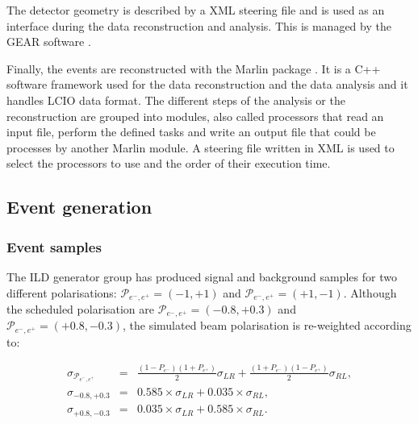     The detector geometry is described by a XML steering file and is used as an interface during the data reconstruction and analysis.
    This is managed by the \gls{GEAR} software \cite{GEAR}.

    Finally, the events are reconstructed with the \gls{Marlin} package \cite{MARLIN}.
    It is a C++ software framework used for the data reconstruction and the data analysis and it handles \gls{LCIO} data format.
    The different steps of the analysis or the reconstruction are grouped into modules, also called processors that read an input file, perform the defined tasks and write an output file that could be processes by another \gls{Marlin} module.
    A steering file written in XML is used to select the processors to use and the order of their execution time.

  \subsection{Event generation}
     
     \subsubsection{Event samples}

     The \gls{ILD} generator group has produced signal and background samples for two different polarisations:  $\mathcal{P}_{e^-,e^+} = (-1,+1)$ and $\mathcal{P}_{e^-,e^+} = (+1,-1)$.
     Although the scheduled polarisation are $\mathcal{P}_{e^-,e^+} = (-0.8,+0.3)$ and  $\mathcal{P}_{e^-,e^+} = (+0.8,-0.3)$, the simulated beam polarisation is re-weighted according to:
     
     \begin{equation}
       \begin{array}{lrc}
       \sigma_{\mathcal{P}_{e^-,e^+}} & = & \frac{(1 - P_{e^-})(1+P_{e^+})}{2} \sigma_{LR} + \frac{(1+P_{e^-})(1-P_{e^+})}{2} \sigma_{RL}, \\
       \sigma_{-0.8,+0.3} & = & 0.585 \times \sigma_{LR} + 0.035 \times \sigma_{RL}, \\
       \sigma_{+0.8,-0.3} & = & 0.035 \times \sigma_{LR} + 0.585 \times \sigma_{RL}.
       \end{array}
     \end{equation}

